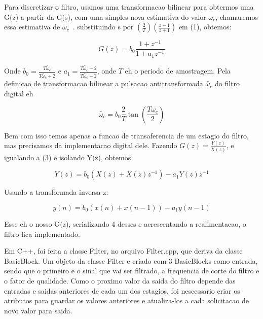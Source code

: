 \documentclass{article}
\begin{document}
Para discretizar o filtro, usamos uma transformacao bilinear para obtermos uma G(z) a partir da G(s), 
com uma simples nova estimativa do valor $\omega_c$, chamaremos essa estimativa de $\omega_c$~.
substituindo s por $(\frac{2}{T})(\frac{z-1}{z+1})$ em (1), obtemos:

\begin{equation}\label{eq:(3)}
G(z) = b_0 \frac{1+z^{-1}}{1+a_1 z^{-1}}  
\end{equation}


Onde $b_0 = \frac{T \tilde{\omega_c}}{T \tilde{\omega_c}+2}$ e $a_1 = \frac{T \tilde{\omega_c} -2}{T\tilde{\omega_c} +2}$, onde $T$ eh o periodo de amostragem.
Pela definicao de transformacao bilinear a pulsacao antitransformada $\tilde{\omega_c}$ do filtro digital eh

\begin{equation}\label{eq:(4)}
\tilde{\omega_c} = b_0 \frac{2}{T} \tan({\frac{T \omega_c}{2}} ) 
\end{equation}

Bem com isso temos apenas a funcao de transaferencia de um estagio do filtro, mas precisamos da implementacao digital dele.
Fazendo $G(z) = \frac{Y(z)}{X(z)}$, e igualando a (3) e isolando Y(z), obtemos


\begin{equation}\label{eq:(5)}
Y(z) = b_0(X(z)+X(z)z^{-1})-a_1Y(z)z^{-1}
\end{equation}

Usando a transformada inversa z:

\begin{equation}\label{eq:(6)}
y(n)=b_0(x(n)+x(n-1))-a_1 y(n-1)  
\end{equation}


Esse eh o nosso G(z), serializando 4 desses e acrescentando a realimentacao, o filtro fica implementado.

Em C++, foi feita a classe Filter, no arquivo Filter.cpp, que deriva da classe BasicBlock. Um objeto da classe Filter e criado com 3 BasicBlocks como entrada, sendo que o primeiro e o sinal que vai ser filtrado, a frequencia de corte do filtro e o fator de qualidade. Como o proximo valor da saida do filtro depende das entradas e saidas anteriores de cada um dos estagios, foi nescessario criar os atributos para guardar os valores anteriores e atualiza-los a cada solicitacao de novo valor para saida.




\end{document}
